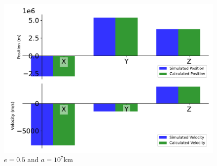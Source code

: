 \begin{figure}[htbp]\centerline{\includegraphics[height=0.7\textwidth, keepaspectratio]{AutoTeX/IncEllip_a_1}}\caption{$e = 0.5$ and $a = 10^7$km}\label{fig:IncEllip_a_1}\end{figure}